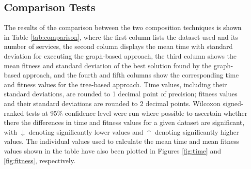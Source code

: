 \subsection{Comparison Tests}

The results of the comparison between the two composition techniques is shown in Table \ref{tab:comparison}, where the first column lists the dataset used and its number of services, the second column displays the mean time with standard deviation for executing the graph-based approach, the third column shows the mean fitness and standard deviation of the best solution found by the graph-based approach, and the fourth and fifth columns show the corresponding time and fitness values for the tree-based approach. Time values, including their standard deviations, are rounded to 1 decimal point of precision; fitness values and their standard deviations are rounded to 2 decimal points. Wilcoxon signed-ranked tests at 95\% confidence level were run where possible to ascertain whether there the differences in time and fitness values for a given dataset are significant, with $\downarrow$ denoting significantly lower values and $\uparrow$ denoting significantly higher values. The individual values used to calculate the mean time and mean fitness values shown in the table have also been plotted in Figures \ref{fig:time} and \ref{fig:fitness}, respectively.

